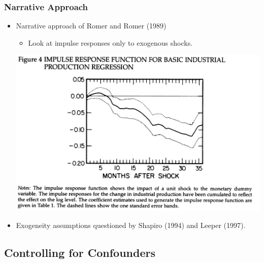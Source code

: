 \documentclass[english,xcolor=svgnames]{beamer}
\begin{document}
\begin{frame}
\frametitle{Narrative Approach}
\begin{itemize}
	\item Narrative approach of Romer and Romer (1989)
	\begin{itemize}
		\item Look at impulse responses only to exogenous shocks.
	\end{itemize}
\begin{center}\includegraphics[scale=0.4]{../../Images/RR1989IP.png}\end{center}
	\item Exogeneity assumptions questioned by Shapiro (1994) and Leeper (1997).
\end{itemize}
\end{frame}

\subsection{Controlling for Confounders}
\end{document}
